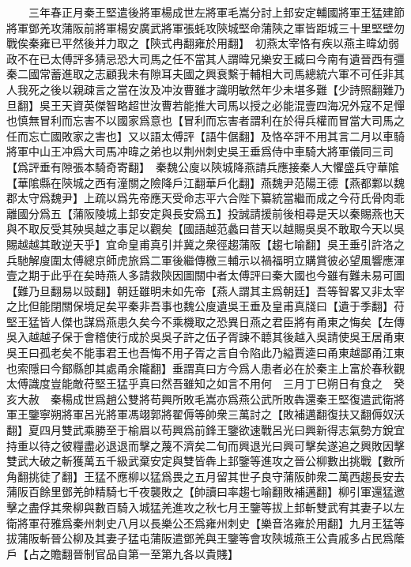 　　三年春正月秦王堅遣後將軍楊成世左將軍毛嵩分討上邽安定輔國將軍王猛建節將軍鄧羌攻蒲阪前將軍楊安廣武將軍張蚝攻陝城堅命蒲陝之軍皆距城三十里堅壁勿戰俟秦雍已平然後并力取之【陝式冉翻雍於用翻】　初燕太宰恪有疾以燕主暐幼弱政不在已太傅評多猜忌恐大司馬之任不當其人謂暐兄樂安王臧曰今南有遺晉西有彊秦二國常蓄進取之志顧我未有隙耳夫國之興衰繫于輔相大司馬總統六軍不可任非其人我死之後以親疎言之當在汝及冲汝曹雖才識明敏然年少未堪多難【少詩照翻難乃旦翻】吳王天資英傑智略超世汝曹若能推大司馬以授之必能混壹四海况外寇不足憚也慎無冒利而忘害不以國家爲意也【冒利而忘害者謂利在於得兵權而冒當大司馬之任而忘亡國敗家之害也】又以語太傅評【語牛倨翻】及恪卒評不用其言二月以車騎將軍中山王冲爲大司馬冲暐之弟也以荆州刺史吳王垂爲侍中車騎大將軍儀同三司【爲評垂有隙張本騎奇寄翻】　秦魏公廋以陝城降燕請兵應接秦人大懼盛兵守華隂【華隂縣在陝城之西有潼關之險降戶江翻華戶化翻】燕魏尹范陽王德【燕都鄴以魏郡太守爲魏尹】上疏以爲先帝應天受命志平六合陛下纂統當繼而成之今苻氏骨肉乖離國分爲五【蒲阪陵城上邽安定與長安爲五】投誠請援前後相尋是天以秦賜燕也天與不取反受其殃吳越之事足以觀矣【國語越范蠡曰昔天以越賜吳吳不敢取今天以吳賜越越其敢逆天乎】宜命皇甫真引并冀之衆徑趨蒲阪【趨七喻翻】吳王垂引許洛之兵馳解廋圍太傅總京師虎旅爲二軍後繼傳檄三輔示以禍福明立購賞彼必望風響應渾壹之期于此乎在矣時燕人多請救陝因圖關中者太傅評曰秦大國也今雖有難未易可圖【難乃旦翻易以豉翻】朝廷雖明未如先帝【燕人謂其主爲朝廷】吾等智畧又非太宰之比但能閉關保境足矣平秦非吾事也魏公廋遺吳王垂及皇甫真牋曰【遺于季翻】苻堅王猛皆人傑也謀爲燕患久矣今不乘機取之恐異日燕之君臣將有甬東之悔矣【左傳吳入越越子保于會稽使行成於吳吳子許之伍子胥諫不聼其後越入吳請使吳王居甬東吳王曰孤老矣不能事君王也吾悔不用子胥之言自令陷此乃縊賈逵曰甬東越鄙甬江東也索隱曰今鄮縣卽其處甬余隴翻】垂謂真曰方今爲人患者必在於秦主上富於春秋觀太傅識度豈能敵苻堅王猛乎真曰然吾雖知之如言不用何　三月丁巳朔日有食之　癸亥大赦　秦楊成世爲趙公雙將苟興所敗毛嵩亦爲燕公武所敗犇還秦王堅復遣武衛將軍王鑒寧朔將軍呂光將軍馮翊郭將翟傉等帥衆三萬討之【敗補邁翻復扶又翻傉奴沃翻】夏四月雙武乘勝至于榆眉以苟興爲前鋒王鑒欲速戰呂光曰興新得志氣勢方銳宜持重以待之彼糧盡必退退而擊之蔑不濟矣二旬而興退光曰興可擊矣遂追之興敗因擊雙武大破之斬獲萬五千級武棄安定與雙皆犇上邽鑒等進攻之晉公柳數出挑戰【數所角翻挑徒了翻】王猛不應柳以猛爲畏之五月留其世子良守蒲阪帥衆二萬西趨長安去蒲阪百餘里鄧羌帥精騎七千夜襲敗之【帥讀曰率趨七喻翻敗補邁翻】柳引軍還猛邀擊之盡俘其衆柳與數百騎入城猛羌進攻之秋七月王鑒等拔上邽斬雙武宥其妻子以左衛將軍苻雅爲秦州刺史八月以長樂公丕爲雍州刺史【樂音洛雍於用翻】九月王猛等拔蒲阪斬晉公柳及其妻子猛屯蒲阪遣鄧羌與王鑒等會攻陝城燕王公貴戚多占民爲䕃戶【占之贍翻晉制官品自第一至第九各以貴賤】

